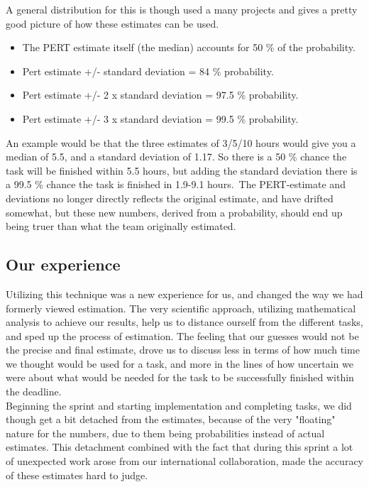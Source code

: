 A general distribution for this is though used a many projects and gives a pretty good picture of how these estimates can be used.\
\begin{itemize}


\item The PERT estimate itself (the median) accounts for 50 \% of the probability.
\item Pert estimate +/- standard deviation = 84 \% probability.
\item Pert estimate +/- 2 x standard deviation = 97.5 \% probability.
\item Pert estimate +/- 3 x standard deviation = 99.5 \% probability.
\end{itemize}
An example would be that the three estimates of 3/5/10 hours would give you a median of 5.5, and a standard deviation of 1.17. So there is a 50 \% chance the task will be finished within 5.5 hours, but adding the standard deviation there is a 99.5 \% chance the task is finished in 1.9-9.1 hours.\
The PERT-estimate and deviations no longer directly reflects the original estimate, and have drifted somewhat, but these new numbers, derived from a probability, should end up being truer than what the team originally estimated. \\



\subsection{Our experience}
Utilizing this technique was a new experience for us, and changed the way we had formerly viewed estimation. The very scientific approach, utilizing mathematical analysis to achieve our results, help us to distance ourself from the different tasks, and sped up the process of estimation. The feeling that our guesses would not be the precise and final estimate, drove us to discuss less in terms of how much time we thought would be used for a task, and more in the lines of how uncertain we were about what would be needed for the task to be successfully finished within the deadline. \\

Beginning the sprint and starting implementation and completing tasks, we did though get a bit detached from the estimates, because of the very "floating" nature for the numbers, due to them being probabilities instead of actual estimates. This detachment combined with the fact that during this sprint a lot of unexpected work arose from our international collaboration, made the accuracy of these estimates hard to judge. \\

